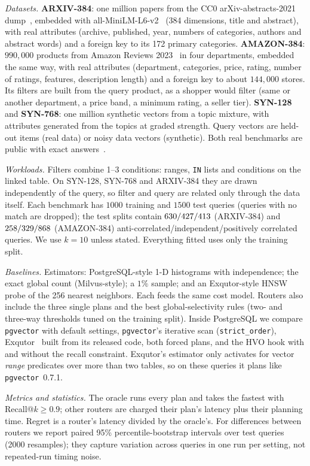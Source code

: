 \documentclass[sigconf, nonacm]{acmart}
\begin{document}
\emph{Datasets.} \textbf{ARXIV-384}: one million papers from the CC0 arXiv-abstracts-2021 dump~\cite{arxivdump}, embedded with all-MiniLM-L6-v2~\cite{reimers2019sbert} (384 dimensions, title and abstract), with real attributes (archive, published, year, numbers of categories, authors and abstract words) and a foreign key to its 172 primary categories. \textbf{AMAZON-384}: $990{,}000$ products from Amazon Reviews 2023~\cite{hou2024amazon} in four departments, embedded the same way, with real attributes (department, categories, price, rating, number of ratings, features, description length) and a foreign key to about $144{,}000$ stores. Its filters are built from the query product, as a shopper would filter (same or another department, a price band, a minimum rating, a seller tier). \textbf{SYN-128} and \textbf{SYN-768}: one million synthetic vectors from a topic mixture, with attributes generated from the topics at graded strength. Query vectors are held-out items (real data) or noisy data vectors (synthetic). Both real benchmarks are public with exact answers~\cite{hvobench}.

\emph{Workloads.} Filters combine 1--3 conditions: ranges, \texttt{IN} lists and conditions on the linked table. On SYN-128, SYN-768 and ARXIV-384 they are drawn independently of the query, so filter and query are related only through the data itself. Each benchmark has $1000$ training and $1500$ test queries (queries with no match are dropped); the test splits contain $630/427/413$ (ARXIV-384) and $258/329/868$ (AMAZON-384) anti-correlated/independent/positively correlated queries. We use $k=10$ unless stated. Everything fitted uses only the training split.

\emph{Baselines.} Estimators: PostgreSQL-style 1-D histograms with independence; the exact global count (Milvus-style); a $1\%$ sample; and an Exqutor-style HNSW probe of the 256 nearest neighbors. Each feeds the same cost model. Routers also include the three single plans and the best global-selectivity rules (two- and three-way thresholds tuned on the training split). Inside PostgreSQL we compare \texttt{pgvector} with default settings, \texttt{pgvector}'s iterative scan (\texttt{strict\_order}), Exqutor~\cite{exqutor2026} built from its released code, both forced plans, and the HVO hook with and without the recall constraint. Exqutor's estimator only activates for vector \emph{range} predicates over more than two tables, so on these queries it plans like \texttt{pgvector}~0.7.1.

\emph{Metrics and statistics.} The oracle runs every plan and takes the fastest with Recall@$k\ge0.9$; other routers are charged their plan's latency plus their planning time. Regret is a router's latency divided by the oracle's. For differences between routers we report paired 95\% percentile-bootstrap intervals over test queries (2000 resamples); they capture variation across queries in one run per setting, not repeated-run timing noise.
\end{document}
